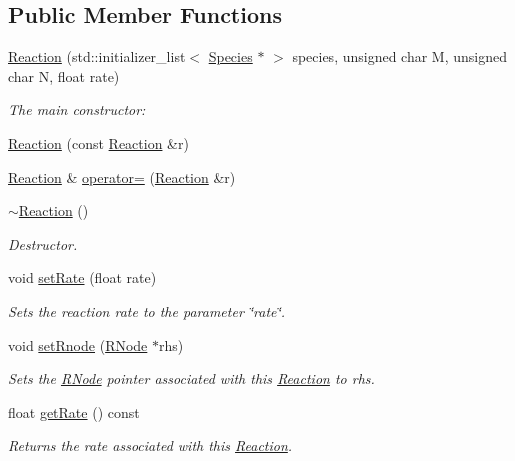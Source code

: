 \subsection*{Public Member Functions}
\begin{DoxyCompactItemize}
\item 
\hyperlink{classchem_1_1Reaction_a357e31612d0c232d22bb3673fffb75c2}{Reaction} (std\-::initializer\-\_\-list$<$ \hyperlink{classchem_1_1Species}{Species} $\ast$ $>$ species, unsigned char M, unsigned char N, float rate)
\begin{DoxyCompactList}\small\item\em The main constructor\-: \end{DoxyCompactList}\item 
\hyperlink{classchem_1_1Reaction_a6557de5f31aa20434edc8ff2c780a71e}{Reaction} (const \hyperlink{classchem_1_1Reaction}{Reaction} \&r)
\item 
\hyperlink{classchem_1_1Reaction}{Reaction} \& \hyperlink{classchem_1_1Reaction_ae0c7b46c61af874a03ce6d826884711b}{operator=} (\hyperlink{classchem_1_1Reaction}{Reaction} \&r)
\item 
\hyperlink{classchem_1_1Reaction_a54eb494f216da7e4b462885d7715fc39}{$\sim$\-Reaction} ()
\begin{DoxyCompactList}\small\item\em Destructor. \end{DoxyCompactList}\item 
void \hyperlink{classchem_1_1Reaction_aad9d07693c386d626a9cd1eaf64ad507}{set\-Rate} (float rate)
\begin{DoxyCompactList}\small\item\em Sets the reaction rate to the parameter \char`\"{}rate\char`\"{}. \end{DoxyCompactList}\item 
void \hyperlink{classchem_1_1Reaction_a5a7d582d4c2f5a447da9844a0e4c5f97}{set\-Rnode} (\hyperlink{classchem_1_1RNode}{R\-Node} $\ast$rhs)
\begin{DoxyCompactList}\small\item\em Sets the \hyperlink{classchem_1_1RNode}{R\-Node} pointer associated with this \hyperlink{classchem_1_1Reaction}{Reaction} to rhs. \end{DoxyCompactList}\item 
float \hyperlink{classchem_1_1Reaction_a4661af0fbf33c822ba8ee530a8498ae7}{get\-Rate} () const 
\begin{DoxyCompactList}\small\item\em Returns the rate associated with this \hyperlink{classchem_1_1Reaction}{Reaction}. \end{DoxyCompactList}\item 

\end{DoxyCompactItemize}

